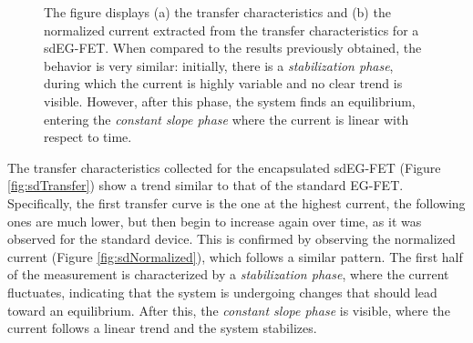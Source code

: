 \begin{figure}
    \centering
    \hfill
    \caption{The figure displays
    (a) the transfer characteristics and 
    (b) the normalized current extracted from the transfer characteristics for a sdEG-FET. When compared to the results previously obtained, the behavior is very similar: initially, there is a \emph{stabilization phase}, during which the current is highly variable and no clear trend is visible. However, after this phase, the system finds an equilibrium, entering the \emph{constant slope phase} where the current is linear with respect to time.}
    \label{fig:sdData}
\end{figure}

The transfer characteristics collected for the encapsulated sdEG-FET (Figure \ref{fig:sdTransfer}) show a trend similar to that of the standard EG-FET. Specifically, the first transfer curve is the one at the highest current, the following ones are much lower, but then begin to increase again over time, as it was observed for the standard device. This is confirmed by observing the normalized current (Figure \ref{fig:sdNormalized}), which follows a similar pattern. The first half of the measurement is characterized by a \emph{stabilization phase}, where the current fluctuates, indicating that the system is undergoing changes that should lead toward an equilibrium. After this, the \emph{constant slope phase} is visible, where the current follows a linear trend and the system stabilizes. 

